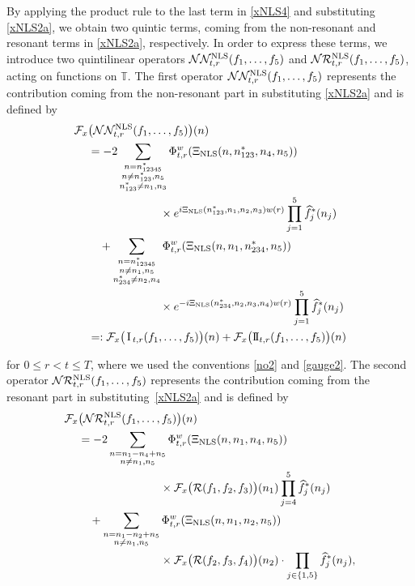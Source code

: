 \documentclass[letterpaper, 11pt,  reqno]{amsart}
\newcommand{\1}{\hspace{0.5mm}\text{I}\hspace{0.5mm}}
\newcommand{\II}{\text{I \hspace{-2.8mm} I} }
\newcommand{\noi}{\noindent}
\newcommand{\T}{\mathbb{T}}
\newcommand{\RR}{\mathcal{R}}
\newcommand{\F}{\mathcal{F}}
\newcommand{\ft}{\widehat}
\newcommand{\NN}{\mathcal{N}}
\newcommand{\NLS}{\text{\rm NLS} }
\numberwithin{equation}{section}
\numberwithin{theorem}{section}
\begin{document}
\noi
By applying the product rule to the last term in \eqref{xNLS4}
and substituting
\eqref{xNLS2a}, 
we obtain two 
quintic terms, 
coming from the non-resonant and resonant terms
in \eqref{xNLS2a}, respectively.
In order to express these terms, 
we introduce two  
quintilinear operators  
$\NN \NN^\NLS_{t, r}(f_1, \dots, f_5)$
and 
$\NN \RR^\NLS_{t, r}(f_1, \dots, f_5)$, acting on functions on $\T$.
The first operator
$\NN \NN^\NLS_{t, r}(f_1, \dots, f_5)$
 represents the contribution
coming from the non-resonant part in substituting \eqref{xNLS2a}
and is defined by 
\begin{align}
\begin{split}
 \F_x & \big(\NN \NN^\NLS_{t, r}(f_1, \dots, f_5)\big)(n)\\
&  =   - 
2   \sum_{\substack{n = n_{12345}^*\\
n \ne n_{123}^*, n_5\\
n_{123}^* \ne n_1, n_3
}}
 \Phi^w_{t, r}(\Xi_\NLS (n, n_{123}^*, n_4, n_5))
   \\
& \hphantom{XXXXXXX}
\times 
e^{i  \Xi_\NLS (n_{123}^*, n_1, n_2, n_3)w(r)}
\prod_{j = 1}^5{\ft f_j}^*(n_j)\\
& \quad  + 
   \sum_{\substack{n = n_{12345}^*\\
n \ne n_1, n_5\\
n_{234}^* \ne n_2, n_4
}}
 \Phi^w_{t, r}(\Xi_\NLS (n, n_1, n_{234}^*,  n_5))
  \\
& \hphantom{XXXXXXX}
\times 
e^{- i  \Xi_\NLS (n_{234}^*, n_2, n_3, n_4)w(r)}
\prod_{j = 1}^5{\ft f_j}^*(n_j)\\
& =: \F_x\big(\1_{t, r}(f_1, \dots, f_5)\big)(n) + \F_x\big(\II_{t, r}(f_1, \dots, f_5)\big)(n)
\end{split} 
\label{xX5}
\end{align}

\noi
for $0 \le r< t  \le T$, 
where we used the conventions \eqref{no2}
and \eqref{gauge2}.
The second operator
$\NN \RR^\NLS_{t, r}(f_1, \dots, f_5)$
 represents the contribution
coming from the resonant part in substituting~\eqref{xNLS2a}
and is defined by 
\begin{align}
\begin{split}
  \F_x  & \big(\NN \RR^\NLS_{t, r}(f_1, \dots, f_5)\big)(n)\\
&  =    
- 2   
\sum_{\substack{n = n_1 - n_4 + n_5\\ n\neq n_{1},n_{5}}}
 \Phi^w_{t, r}(\Xi_\NLS (n, n_1, n_4, n_5))
 \\
& \hphantom{XXXXXXXX}
\times 
\F_x\big(\RR(f_1, f_2, f_3)\big)(n_1)
 \prod_{j = 4}^5{\ft f}_j^*(n_j)\\
& \quad 
+ 
\sum_{\substack{n = n_1 - n_2 + n_5\\ n\neq n_{1},n_{5}}}
 \Phi^w_{t, r}(\Xi_\NLS (n, n_1, n_2, n_5))
  \\
& \hphantom{XXXXXXXX}
\times 
\F_x\big(\RR(f_2, f_3, f_4)\big)(n_2)
\cdot \prod_{j \in \{1, 5\}} {\ft f}_j^*(n_j), 
\end{split} 
\label{xX6}
\end{align}
\end{document}
